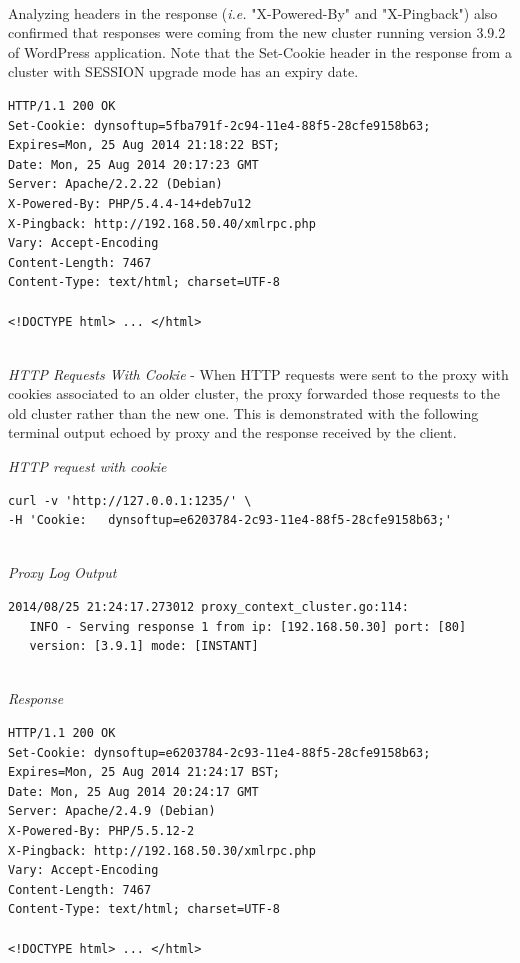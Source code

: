 \documentclass[a4paper,11pt,twoside]{report}
\begin{document}
\noindent\\
Analyzing headers in the response (\textit{i.e.} "X-Powered-By" and "X-Pingback") also confirmed that responses were coming from the new cluster running version 3.9.2 of WordPress application. Note that the Set-Cookie header in the response from a cluster with SESSION upgrade mode has an expiry date. \smallskip 

\begin{lstlisting}[language=terminal]
HTTP/1.1 200 OK
Set-Cookie: dynsoftup=5fba791f-2c94-11e4-88f5-28cfe9158b63; Expires=Mon, 25 Aug 2014 21:18:22 BST;
Date: Mon, 25 Aug 2014 20:17:23 GMT
Server: Apache/2.2.22 (Debian)
X-Powered-By: PHP/5.4.4-14+deb7u12
X-Pingback: http://192.168.50.40/xmlrpc.php
Vary: Accept-Encoding
Content-Length: 7467
Content-Type: text/html; charset=UTF-8

<!DOCTYPE html> ... </html>
\end{lstlisting}

\noindent\\
\textit{HTTP Requests With Cookie} - When HTTP requests were sent to the proxy with cookies  associated to an older cluster, the proxy forwarded those requests to the old cluster rather than the new one. This is demonstrated with the following terminal output echoed by proxy and the response received by the client. \medskip 

\noindent
\textit{HTTP request with cookie}
\begin{lstlisting}[language=terminal]
curl -v 'http://127.0.0.1:1235/' \
-H 'Cookie:   dynsoftup=e6203784-2c93-11e4-88f5-28cfe9158b63;'
\end{lstlisting}

\noindent\\
\textit{Proxy Log Output}
\begin{lstlisting}[language=terminal]
2014/08/25 21:24:17.273012 proxy_context_cluster.go:114:     
   INFO - Serving response 1 from ip: [192.168.50.30] port: [80] 
   version: [3.9.1] mode: [INSTANT]
\end{lstlisting}

\noindent\\
\textit{Response}
\begin{lstlisting}[language=terminal]
HTTP/1.1 200 OK
Set-Cookie: dynsoftup=e6203784-2c93-11e4-88f5-28cfe9158b63; Expires=Mon, 25 Aug 2014 21:24:17 BST;
Date: Mon, 25 Aug 2014 20:24:17 GMT
Server: Apache/2.4.9 (Debian)
X-Powered-By: PHP/5.5.12-2
X-Pingback: http://192.168.50.30/xmlrpc.php
Vary: Accept-Encoding
Content-Length: 7467
Content-Type: text/html; charset=UTF-8

<!DOCTYPE html> ... </html>
\end{lstlisting}
\end{document}
